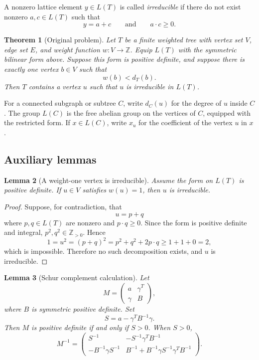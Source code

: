\documentclass[12pt]{article}
\newcommand{\Z}{\mathbb{Z}}
\newtheorem{theorem}{Theorem}
\newtheorem{lemma}[theorem]{Lemma}
\begin{document}
A nonzero lattice element \(y\in L(T)\) is called \emph{irreducible} if there do not exist nonzero \(a,c\in L(T)\) such that
\[
y=a+c
\qquad\text{and}\qquad
a\cdot c\ge 0.
\]

\begin{theorem}[Original problem]\label{thm:main}
Let \(T\) be a finite weighted tree with vertex set \(V\), edge set \(E\), and weight function \(w:V\to\Z\). Equip \(L(T)\) with the symmetric bilinear form above. Suppose this form is positive definite, and suppose there is exactly one vertex \(b\in V\) such that
\[
w(b)<d_T(b).
\]
Then \(T\) contains a vertex \(u\) such that \(u\) is irreducible in \(L(T)\).
\end{theorem}

For a connected subgraph or subtree \(C\), write \(d_C(u)\) for the degree of \(u\) inside \(C\). The group \(L(C)\) is the free abelian group on the vertices of \(C\), equipped with the restricted form. If \(x\in L(C)\), write \(x_u\) for the coefficient of the vertex \(u\) in \(x\).

\subsection*{Auxiliary lemmas}

\begin{lemma}[A weight-one vertex is irreducible]\label{lem:weight-one}
Assume the form on \(L(T)\) is positive definite. If \(u\in V\) satisfies \(w(u)=1\), then \(u\) is irreducible.
\end{lemma}

\begin{proof}
Suppose, for contradiction, that
\[
u=p+q
\]
where \(p,q\in L(T)\) are nonzero and \(p\cdot q\ge 0\). Since the form is positive definite and integral, \(p^2,q^2\in\Z_{>0}\). Hence
\[
1=u^2=(p+q)^2=p^2+q^2+2p\cdot q
\ge 1+1+0=2,
\]
which is impossible. Therefore no such decomposition exists, and \(u\) is irreducible.
\end{proof}

\begin{lemma}[Schur complement calculation]\label{lem:schur}
Let
\[
M=
\begin{pmatrix}
a & \gamma^T\\
\gamma & B
\end{pmatrix},
\]
where \(B\) is symmetric positive definite. Set
\[
S=a-\gamma^T B^{-1}\gamma.
\]
Then \(M\) is positive definite if and only if \(S>0\). When \(S>0\),
\[
M^{-1}=
\begin{pmatrix}
S^{-1} & -S^{-1}\gamma^T B^{-1}\\
-B^{-1}\gamma S^{-1} &
B^{-1}+B^{-1}\gamma S^{-1}\gamma^T B^{-1}
\end{pmatrix}.
\]
\end{lemma}
\end{document}
